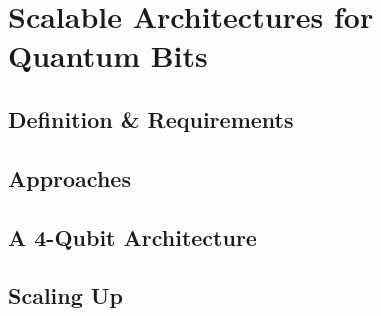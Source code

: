 \chapter{Scalable Architectures for Quantum Bits}

\section{Definition \& Requirements}

\section{Approaches}



\section{A 4-Qubit Architecture}


\section{Scaling Up}

